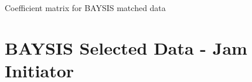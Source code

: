 \begin{appendices}
    \begin{sidewaystable}
    	\fontsize{3}{5}\selectfont
    	\setlength{\tabcolsep}{2pt}
    	\centering
    	
    	\caption{Coefficient matrix for BAYSIS matched data}
    	\label{table:appendix_coefficient_matrix_matched}
    \end{sidewaystable}
        
    
    \tocless\section{BAYSIS Selected Data - Jam Initiator}
    \label{appendix_baysis_selected_startJam}
    
    
    
    
    

\end{appendices}

